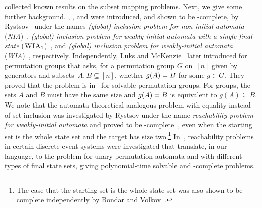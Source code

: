 collected known results on the subset mapping problems.
Next, we give some further background.	
\SIS, \SFS, and
\ST were introduced, and shown to be \PSPACE-complete,
by Rystsov~\cite{Rys83} under the names 
\emph{(global) inclusion problem 
	for non-initial  au\-tom\-a\-ta} (\emph{NIA})~\cite[Thm.~2.1]{Rys83},
\emph{(global) inclusion problem for weakly-initial automata with a single final state} (\emph{$\textsc{WIA}_1$})~\cite[Cor.~3.3]{Rys83},
and \emph{(global) inclusion problem for weakly-initial automata} (\emph{WIA})~\cite[Thm.~2.1]{Rys83}, 
%
%
respectively.
Independently, Luks and McKenzie~\cite{LuksM88}
later introduced \ST for permutation groups that asks, %
for a permutation group $G$ on~$[n]$ given by generators and subsets~$A,B \subseteq [n]$,
whether  $\applyfunc{A}{g} = B$ for some $g \in G$. 
They proved that the problem is in \NC\ for  solvable permutation groups. %
For groups, the sets $A$ and $B$ must have the same size
and $\applyfunc{A}{g} = B$ is equivalent to $g(A) \subseteq B$.
We note that the automata-theoretical analogous problem 
with equality instead of set inclusion
was investigated by Rystsov under the name \emph{reachability problem for weakly-initial automata}
and proved to be \PSPACE-complete~\cite[Thm.~3.2]{Rys83},
even when the starting set is the whole state set and the target has size two.\footnote{The case
that the starting set is the whole state set was also
shown to be \PSPACE-complete independently by Bondar and Volkov~\cite[Thm.~3]{BondarV16}.}
In~\cite{GOLASZEWSKI1989431}, reachability problems in certain discrete event systems
were investigated that translate, in our language, to the problem \DFAINT 
for unary permutation automata and with different types of final state sets,
giving polynomial-time solvable and \NP-complete problems.


